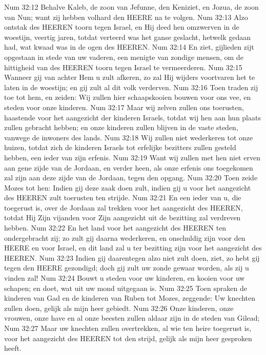 Num 32:12  Behalve Kaleb, de zoon van Jefunne, den Keniziet, en Jozua, de zoon van Nun; want zij hebben volhard den HEERE na te volgen.
Num 32:13  Alzo ontstak des HEEREN toorn tegen Israel, en Hij deed hen omzwerven in de woestijn, veertig jaren, totdat verteerd was het ganse geslacht, hetwelk gedaan had, wat kwaad was in de ogen des HEEREN.
Num 32:14  En ziet, gijlieden zijt opgestaan in stede van uw vaderen, een menigte van zondige mensen, om de hittigheid van des HEEREN toorn tegen Israel te vermeerderen.
Num 32:15  Wanneer gij van achter Hem u zult afkeren, zo zal Hij wijders voortvaren het te laten in de woestijn; en gij zult al dit volk verderven.
Num 32:16  Toen traden zij toe tot hem, en zeiden: Wij zullen hier schaapskooien bouwen voor ons vee, en steden voor onze kinderen.
Num 32:17  Maar wij zelven zullen ons toerusten, haastende voor het aangezicht der kinderen Israels, totdat wij hen aan hun plaats zullen gebracht hebben; en onze kinderen zullen blijven in de vaste steden, vanwege de inwoners des lands.
Num 32:18  Wij zullen niet wederkeren tot onze huizen, totdat zich de kinderen Israels tot erfelijke bezitters zullen gesteld hebben, een ieder van zijn erfenis.
Num 32:19  Want wij zullen met hen niet erven aan gene zijde van de Jordaan, en verder heen, als onze erfenis ons toegekomen zal zijn aan deze zijde van de Jordaan, tegen den opgang.
Num 32:20  Toen zeide Mozes tot hen: Indien gij deze zaak doen zult, indien gij u voor het aangezicht des HEEREN zult toerusten ten strijde.
Num 32:21  En een ieder van u, die toegerust is, over de Jordaan zal trekken voor het aangezicht des HEEREN, totdat Hij Zijn vijanden voor Zijn aangezicht uit de bezitting zal verdreven hebben.
Num 32:22  En het land voor het aangezicht des HEEREN ten ondergebracht zij; zo zult gij daarna wederkeren, en onschuldig zijn voor den HEERE en voor Israel, en dit land zal u ter bezitting zijn voor het aangezicht des HEEREN.
Num 32:23  Indien gij daarentegen alzo niet zult doen, ziet, zo hebt gij tegen den HEERE gezondigd; doch gij zult uw zonde gewaar worden, als zij u vinden zal!
Num 32:24  Bouwt u steden voor uw kinderen, en kooien voor uw schapen; en doet, wat uit uw mond uitgegaan is.
Num 32:25  Toen spraken de kinderen van Gad en de kinderen van Ruben tot Mozes, zeggende: Uw knechten zullen doen, gelijk als mijn heer gebiedt.
Num 32:26  Onze kinderen, onze vrouwen, onze have en al onze beesten zullen aldaar zijn in de steden van Gilead;
Num 32:27  Maar uw knechten zullen overtrekken, al wie ten heire toegerust is, voor het aangezicht des HEEREN tot den strijd, gelijk als mijn heer gesproken heeft.
